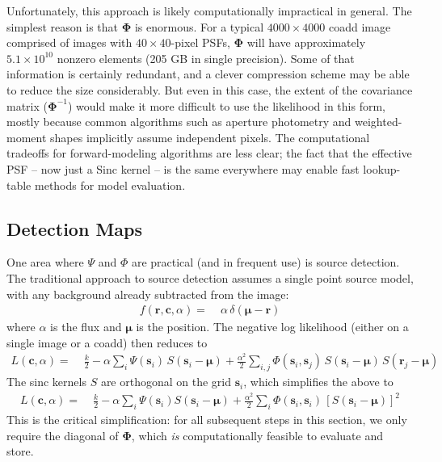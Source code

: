 \documentclass[10pt]{article}
\begin{document}
Unfortunately, this approach is likely computationally impractical in general.  The simplest reason is that $\bm{\Phi}$ is enormous.  For a typical $4000 \times 4000$ coadd image comprised of images with $40\times 40$-pixel PSFs, $\bm{\Phi}$ will have approximately $5.1\times 10^10$ nonzero elements (205 GB in single precision).  Some of that information is certainly redundant, and a clever compression scheme may be able to reduce the size considerably.  But even in this case, the extent of the covariance matrix ($\bm{\Phi}^{-1}$) would make it more difficult to use the likelihood in this form, mostly because common algorithms such as aperture photometry and weighted-moment shapes implicitly assume independent pixels.  The computational tradeoffs for forward-modeling algorithms are less clear; the fact that the effective PSF -- now just a Sinc kernel -- is the same everywhere may enable fast lookup-table methods for model evaluation.

\subsection{Detection Maps}

One area where $\Psi$ and $\Phi$ are practical (and in frequent use) is source detection.  The traditional approach to source detection assumes a single point source model, with any background already subtracted from the image:
\begin{align}
f(\bm{r},\bm{c},\alpha) =\;& \alpha\,\delta(\bm{\mu}-\bm{r})
\end{align}
where $\alpha$ is the flux and $\bm{\mu}$ is the position.  The negative log likelihood (either on a single image or a coadd) then reduces to
\begin{align}
L(\bm{c},\alpha) =\;& \frac{k}{2}
        - \alpha \sum_i \Psi(\bm{s}_i)\,S(\bm{s}_i-\bm{\mu})
        + \frac{\alpha^2}{2} \sum_{i,j}
            \Phi(\bm{s}_i,\bm{s}_j)\,S(\bm{s}_i-\bm{\mu})
                \,S(\bm{r}_j - \bm{\mu})
\end{align}
The sinc kernels $S$ are orthogonal on the grid $\bm{s}_i$, which simplifies the above to
\begin{align}
L(\bm{c},\alpha) =\;& \frac{k}{2}
        - \alpha \sum_i \Psi(\bm{s}_i) S(\bm{s}_i-\bm{\mu})
        + \frac{\alpha^2}{2} \sum_{i}
            \Phi(\bm{s}_i,\bm{s}_i)\,\left[S(\bm{s}_i-\bm{\mu})\right]^2
\end{align}
This is the critical simplification: for all subsequent steps in this section, we only require the diagonal of $\bm{\Phi}$, which \emph{is} computationally feasible to evaluate and store.
\end{document}
